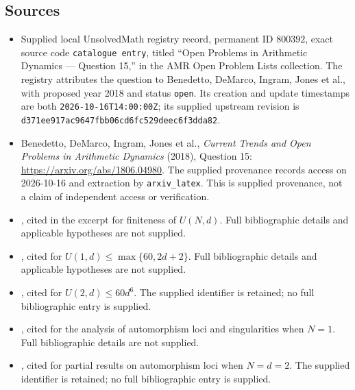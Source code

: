 \documentclass[11pt]{article}
\begin{document}
\subsection{Sources}
\begin{itemize}
\item Supplied local UnsolvedMath registry record, permanent ID \(800392\), exact source code \texttt{catalogue entry}, titled ``Open Problems in Arithmetic Dynamics --- Question 15,'' in the AMR Open Problem Lists collection. The registry attributes the question to Benedetto, DeMarco, Ingram, Jones et al., with proposed year 2018 and status \texttt{open}. Its creation and update timestamps are both \texttt{2026-10-16T14:00:00Z}; its supplied upstream revision is \texttt{d371ee917ac9647fbb06cd6fc529deec6f3dda82}.
\item Benedetto, DeMarco, Ingram, Jones et al., \emph{Current Trends and Open Problems in Arithmetic Dynamics} (2018), Question 15: \url{https://arxiv.org/abs/1806.04980}. The supplied provenance records access on 2026-10-16 and extraction by \texttt{arxiv\_latex}. This is supplied provenance, not a claim of independent access or verification.
\item [MR2741188], cited in the excerpt for finiteness of \(U(N,d)\). Full bibliographic details and applicable hypotheses are not supplied.
\item [MR2884382, Example 2.54], cited for \(U(1,d)\leq\max\{60,2d+2\}\). Full bibliographic details and applicable hypotheses are not supplied.
\item [arxiv1509.06670, Theorem 6.2], cited for \(U(2,d)\leq60d^6\). The supplied identifier is retained; no full bibliographic entry is supplied.
\item [MR3709645], cited for the analysis of automorphism loci and singularities when \(N=1\). Full bibliographic details are not supplied.
\item [arxiv1607.05772], cited for partial results on automorphism loci when \(N=d=2\). The supplied identifier is retained; no full bibliographic entry is supplied.
\end{itemize}
\end{document}

